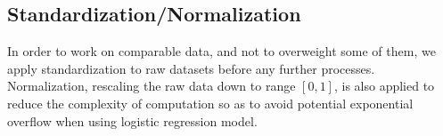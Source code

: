 \documentclass[10pt,conference,compsocconf]{IEEEtran}
\begin{document}


\subsection{Standardization/Normalization}
In order to work on comparable data, and not to overweight some of them, we apply standardization to raw datasets before any further processes. Normalization, rescaling the raw data down to range $[0, 1]$, is also applied to reduce the complexity of computation so as to avoid potential exponential overflow when using logistic regression model.
\end{document}
